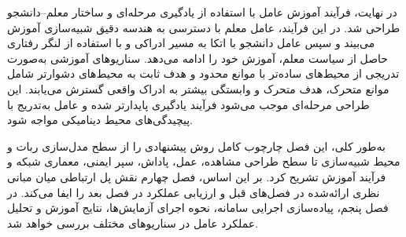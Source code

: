 در نهایت، فرآیند آموزش عامل با استفاده از یادگیری مرحله‌ای و ساختار معلم--دانشجو طراحی شد. در این فرآیند، عامل معلم با دسترسی به هندسه دقیق شبیه‌سازی آموزش می‌بیند و سپس عامل دانشجو با اتکا به مسیر ادراکی و با استفاده از لنگر رفتاری حاصل از سیاست معلم، آموزش خود را ادامه می‌دهد. سناریوهای آموزشی به‌صورت تدریجی از محیط‌های ساده‌تر با موانع محدود و هدف ثابت به محیط‌های دشوارتر شامل موانع متحرک، هدف متحرک و وابستگی بیشتر به ادراک واقعی گسترش می‌یابند. این طراحی مرحله‌ای موجب می‌شود فرآیند یادگیری پایدارتر شده و عامل به‌تدریج با پیچیدگی‌های محیط دینامیکی مواجه شود.

به‌طور کلی، این فصل چارچوب کامل روش پیشنهادی را از سطح مدل‌سازی ربات و محیط شبیه‌سازی تا سطح طراحی مشاهده، عمل، پاداش، سپر ایمنی، معماری شبکه و فرآیند آموزش تشریح کرد. بر این اساس، فصل چهارم نقش پل ارتباطی میان مبانی نظری ارائه‌شده در فصل‌های قبل و ارزیابی عملکرد در فصل بعد را ایفا می‌کند. در فصل پنجم، پیاده‌سازی اجرایی سامانه، نحوه اجرای آزمایش‌ها، نتایج آموزش و تحلیل عملکرد عامل در سناریوهای مختلف بررسی خواهد شد.
